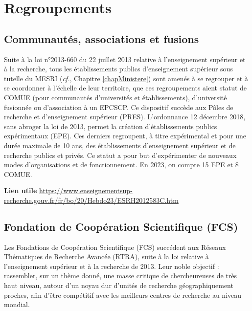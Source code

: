 \section{Regroupements}
\label{Regroupements}
\subsection{Communaut\'es, associations et fusions}
Suite \`a la loi n°2013-660 du 22 juillet 2013 relative \`a  l'enseignement sup\'erieur et \`a la recherche,
tous les \'etablissements publics d'enseignement sup\'erieur sous tutelle du MESRI ({\em cf.}, Chapitre \ref{chapMinistere}) sont amen\'es \`a  se regrouper et \`a se coordonner \`a l'\'echelle de leur territoire, que ces regroupements aient statut de COMUE (pour communaut\'es d'universit\'es et \'etablissements), d'universit\'e fusionn\'ee ou d'association \`a  un EPCSCP.
Ce dispositif succ\`ede aux P\^oles de recherche et d'enseignement sup\'erieur (PRES). L'ordonnance 12 d\'ecembre 2018, sans abroger la loi de 2013, permet la cr\'eation d'\'etablissements publics exp\'erimentaux (EPE). Ces derniers regroupent, \`a titre exp\'erimental et pour une dur\'ee maximale de 10 ans, des \'etablissements d'enseignement sup\'erieur et de recherche publics et priv\'es. Ce statut a pour but d'exp\'erimenter de nouveaux modes d'organisations et de fonctionnement. En 2023, on compte 15 EPE et 8 COMUE.

\textbf{Lien utile\hspace{.5em}}
\url{https://www.enseignementsup-recherche.gouv.fr/fr/bo/20/Hebdo23/ESRH2012583C.htm}

\subsection{Fondation de Coop\'eration Scientifique (FCS)}

Les Fondations de Coop\'eration Scientifique (FCS) succ\'edent aux R\'eseaux Th\'ematiques de Recherche Avanc\'ee (RTRA), suite à la loi relative \`a l'enseignement sup\'erieur et \`a la recherche de 2013.
Leur noble objectif : rassembler, sur un th\`eme donn\'e, une masse critique de chercheur\mp euse\mp s de tr\`es haut niveau, autour d'un noyau dur d'unit\'es de recherche g\'eographiquement proches, afin d'\^etre comp\'etitif avec les meilleurs centres de recherche au niveau mondial.

